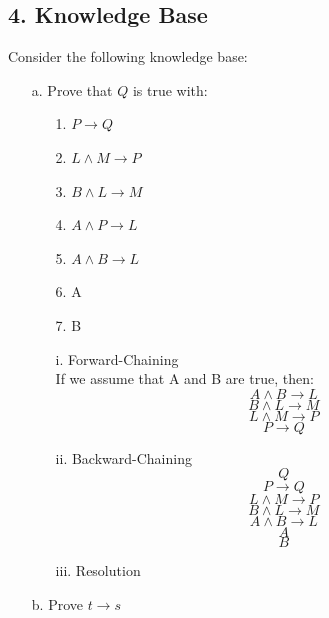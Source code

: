 \documentclass[11pt]{article}
\begin{document}
\begin{flushleft}
\section*{4. Knowledge Base} Consider the following knowledge base:

\begin{enumerate}

    \item[a.] Prove that $Q$ is true with:

        \begin{center}
            \begin{minipage}{0.4\textwidth}
                \begin{enumerate}
                    \item[1.] $P \rightarrow Q$
                    \item[2.] $L \land M \rightarrow P$
                    \item[3.] $B \land L \rightarrow M$
                    \item[4.] $A \land P \rightarrow L$
                    \item[5.] $A \land B \rightarrow L$
                    \item[6.] A
                    \item[7.] B
                \end{enumerate}
            \end{minipage}
        \end{center}

        \begin{enumerate}
            \item[i.] Forward-Chaining \\
                If we assume that A and B are true, then:
                $$ A \wedge B \rightarrow L $$
                $$ B \wedge L \rightarrow M $$
                $$ L \wedge M \rightarrow P $$
                $$ P \rightarrow Q $$
            \item[ii.] Backward-Chaining
                $$ Q $$
                $$ P \rightarrow Q $$
                $$ L \wedge M \rightarrow P $$
                $$ B \wedge L \rightarrow M $$
                $$ A \wedge B \rightarrow L $$
                $$ A $$
                $$ B $$

            \item[iii.] Resolution
        \end{enumerate}

    \item[b.] Prove $t \rightarrow s$


\end{enumerate}
\end{flushleft}
\end{document}
